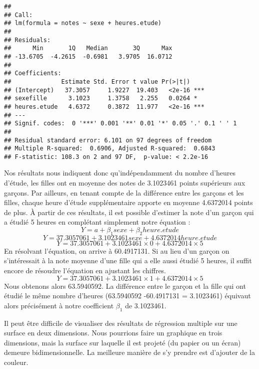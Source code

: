 \documentclass[
]{book}
\begin{document}
\begin{verbatim}
## 
## Call:
## lm(formula = notes ~ sexe + heures.etude)
## 
## Residuals:
##      Min       1Q   Median       3Q      Max 
## -13.6705  -4.2615  -0.6981   3.9705  16.0712 
## 
## Coefficients:
##              Estimate Std. Error t value Pr(>|t|)    
## (Intercept)   37.3057     1.9227  19.403   <2e-16 ***
## sexefille      3.1023     1.3758   2.255   0.0264 *  
## heures.etude   4.6372     0.3872  11.977   <2e-16 ***
## ---
## Signif. codes:  0 '***' 0.001 '**' 0.01 '*' 0.05 '.' 0.1 ' ' 1
## 
## Residual standard error: 6.101 on 97 degrees of freedom
## Multiple R-squared:  0.6906, Adjusted R-squared:  0.6843 
## F-statistic: 108.3 on 2 and 97 DF,  p-value: < 2.2e-16
\end{verbatim}

Nos résultats nous indiquent donc qu'indépendamment du nombre d'heures d'étude, les filles ont en moyenne des notes de 3.1023461 points supérieurs aux garçons. Par ailleurs, en tenant compte de la différence entre les garçons et les filles, chaque heure d'étude supplémentaire apporte en moyenne 4.6372014 points de plus.
À partir de ces résultats, il est possible d'estimer la note d'un garçon qui a étudié 5 heures en complétant simplement notre équation :
\[Y =  a + \beta_1 sexe + \beta_2 heure.etude\]
\[Y =  37.3057061 + 3.1023461 sexe + 4.6372014 heure.etude\]
\[Y =  37.3057061 + 3.1023461 \times 0 + 4.6372014 \times 5\]
En résolvant l'équation, on arrive à 60.4917131. Si au lieu d'un garçon on s'intéressait à la note moyenne d'une fille qui a elle aussi étudié 5 heures, il suffit encore de résoudre l'équation en ajustant les chiffres.
\[Y =  37.3057061 + 3.1023461 \times 1 + 4.6372014 \times 5\]
Nous obtenons alors 63.5940592. La différence entre le garçon et la fille qui ont étudié le même nombre d'heures (63.5940592 -60.4917131 = 3.1023461) équivaut alors précisément à notre coefficient \(\beta_1\) de 3.1023461.

Il peut être difficile de visualiser des résultats de régression multiple sur une surface en deux dimensions. Nous pourrions faire un graphique en trois dimensions, mais la surface sur laquelle il est projeté (du papier ou un écran) demeure bidimensionnelle. La meilleure manière de s'y prendre est d'ajouter de la couleur.
\end{document}
